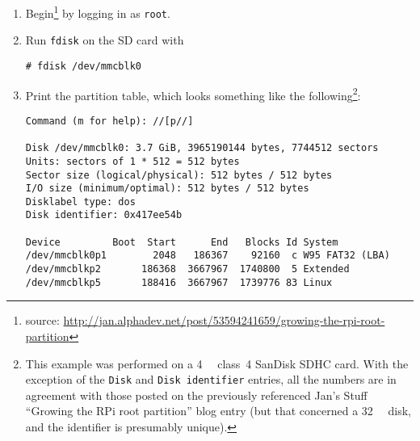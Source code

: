 \documentclass[12pt,letterpaper]{article}
\begin{document}
\begin{enumerate}
\item Begin\footnote{%
source:
\url{http://jan.alphadev.net/post/53594241659/growing-the-rpi-root-partition}} by logging in as \lstinline{root}.

\item Run \lstinline{fdisk} on the SD card with
\begin{lstlisting}
# fdisk /dev/mmcblk0
\end{lstlisting}

\item
Print the partition table, which looks something like the following\footnote{This example was performed on a \SI{4}{\giga\byte} class~4 SanDisk SDHC card.  With the exception of the \lstinline{Disk} and \lstinline{Disk identifier} entries, all the numbers are in agreement with those posted on the previously referenced Jan's Stuff ``Growing the RPi root partition'' blog entry (but that concerned a \SI{32}{\giga\byte} disk, and the identifier is presumably unique).}:


\begin{lstlisting}[basicstyle=\ttfamily\footnotesize]
Command (m for help): //[p//]

Disk /dev/mmcblk0: 3.7 GiB, 3965190144 bytes, 7744512 sectors
Units: sectors of 1 * 512 = 512 bytes
Sector size (logical/physical): 512 bytes / 512 bytes
I/O size (minimum/optimal): 512 bytes / 512 bytes
Disklabel type: dos
Disk identifier: 0x417ee54b

Device         Boot  Start      End   Blocks Id System
/dev/mmcblk0p1        2048   186367    92160  c W95 FAT32 (LBA)
/dev/mmcblkp2       186368  3667967  1740800  5 Extended
/dev/mmcblkp5       188416  3667967  1739776 83 Linux
\end{lstlisting}


\end{enumerate}
\end{document}
